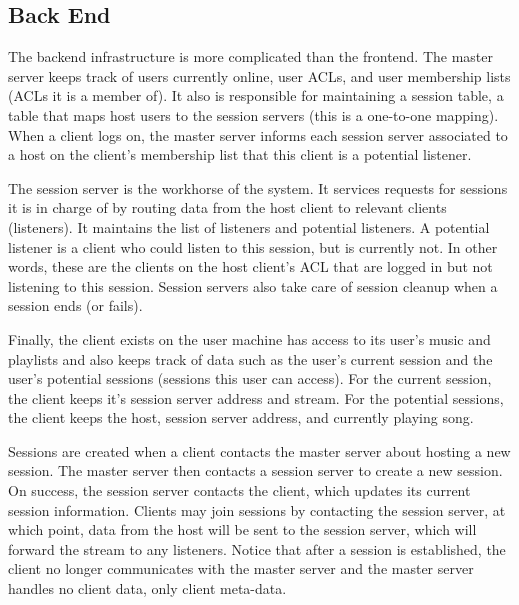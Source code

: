 \subsection{Back End}
\label{sec:backend}
The backend infrastructure is more complicated than 
the frontend. The master server keeps track of users 
currently online, user ACLs, and user membership lists 
(ACLs it is a member of). It also is responsible for 
maintaining a session table, a table that maps host 
users to the session servers (this is a one-to-one mapping). 
When a client logs on, the master server informs each 
session server associated to a host on the client's 
membership list that this client is a potential listener.

The session server is the workhorse of the system. It 
services requests for sessions it is in charge of by 
routing data from the host client to relevant clients 
(listeners). It maintains the list of listeners and 
potential listeners. A potential listener is a client 
who could listen to this session, but is currently not. 
In other words, these are the clients on the host client's 
ACL that are logged in but not listening to this 
session. Session servers also take care of session 
cleanup when a session ends (or fails). 

Finally, the client exists on the user machine 
has access to its user's music and playlists and 
also keeps track of data such as the user's current 
session and the user's potential sessions (sessions 
this user can access). For the current session, the 
client keeps it's session server address and stream. 
For the potential sessions, the client keeps the host, 
session server address, and currently playing song.

Sessions are created when a client contacts the master 
server about hosting a new session. The master server 
then contacts a session server to create a new session. 
On success, the session server contacts the client, 
which updates its current session information. 
Clients may join sessions by contacting the session 
server, at which point, data from the host will be 
sent to the session server, which will forward the 
stream to any listeners. Notice that after a session 
is established, the client no longer communicates 
with the master server and the master server handles 
no client data, only client meta-data. 
